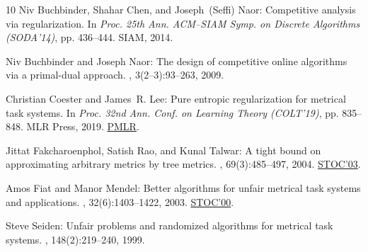 \begin{thebibliography}{10}
{\sc Niv Buchbinder, Shahar Chen, and Joseph~(Seffi) Naor}: Competitive
  analysis via regularization.
\newblock In {\em Proc. 25th Ann. ACM--SIAM Symp. on Discrete Algorithms
  (SODA'14)}, pp. 436--444. SIAM, 2014.
\newblock [\epfmtdoi{10.1137/1.9781611973402.32}]

{\sc Niv Buchbinder and Joseph Naor}: The design of competitive online
  algorithms via a primal-dual approach.
, 3(2--3):93--263, 2009.
\newblock [\epfmtdoi{10.1561/0400000024}]

{\sc Christian Coester and James~R. Lee}: Pure entropic regularization for
  metrical task systems.
\newblock In {\em Proc. 32nd Ann. Conf. on Learning Theory (COLT'19)}, pp.
  835--848. MLR Press, 2019.
\newblock \href{http://proceedings.mlr.press/v99/coester19a.html}{PMLR}.

{\sc Jittat Fakcharoenphol, Satish Rao, and Kunal Talwar}: A tight bound on
  approximating arbitrary metrics by tree metrics.
, 69(3):485--497, 2004.
\newblock \prelim \href{https://doi.org/10.1145/780542.780608}{STOC'03}.

{\sc Amos Fiat and Manor Mendel}: Better algorithms for unfair metrical task
  systems and applications.
, 32(6):1403--1422, 2003.
\newblock \prelim \href{https://doi.org/10.1145/335305.335408}{STOC'00}.

{\sc Steve Seiden}: Unfair problems and randomized algorithms for metrical task
  systems.
, 148(2):219--240, 1999.

\end{thebibliography}
